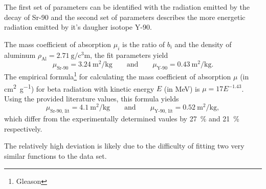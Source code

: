 The first set of parameters can be identified with the radiation emitted by the decay of Sr-90 and the second set of parameters describes the more energetic radiation emitted by it's daugher isotope Y-90.

The mass coefficient of absorption $\mu_i$ is the ratio of $b_i$ and the density of aluminum $\rho_\text{Al} = \SI{2.71}{\gram\per\cubic\centi\meter}$, the fit parameters yield
\begin{equation*}
	\mu_\text{Sr-90} = \SI{3.24}{\meter\squared\per\kilo\gram} \qquad \text{and} \qquad \mu_\text{Y-90} = \SI{0.43}{\meter\squared\per\kilo\gram}.
\end{equation*}
The empirical formula\footnote{Gleason} for calculating the mass coefficient of absorption $\mu$ (in \si{\centi\meter\squared\per\gram}) for beta radiation with kinetic energy $E$ (in \si{\MeV}) is $\mu = 17 E^{-1.43}$.
Using the provided literature values, this formula yields
\begin{equation*}
	\mu_\text{Sr-90, lit} = \SI{4.1}{\meter\squared\per\kilo\gram} \qquad \text{and} \qquad \mu_\text{Y-90, lit} = \SI{0.52}{\meter\squared\per\kilo\gram},
\end{equation*}
which differ from the experimentally determined vaules by \SI{27}{\percent} and \SI{21}{\percent} respectively.

The relatively high deviation is likely due to the difficulty of fitting two very similar functions to the data set.

